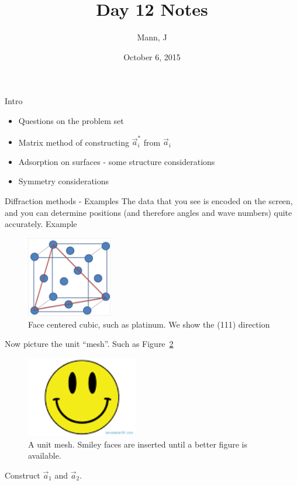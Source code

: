 \documentclass{article}
\author{Mann, J}
\title{Day 12 Notes}
\date{October 6, 2015}
\newcommand{\aone}[0]{\vec{a}_1}
\newcommand{\atwo}[0]{\vec{a}_2}
\begin{document}
\maketitle{}
\begin{section}{Intro}
	\begin{itemize}
		\item Questions on the problem set
		\item Matrix method of constructing $\vec{a}_i^\ast$ from $\vec{a}_i$
		\item Adsorption on surfaces - some structure considerations
		\item Symmetry considerations
	\end{itemize}
\end{section}
\begin{section}{Diffraction methods - Examples}
The data that you see is encoded on the screen, and you can determine positions (and therefore angles and wave numbers) quite accurately.
Example
\begin{figure}[h]
	\centering
	\includegraphics[height=100pt]{FCC111}
	\caption{Face centered cubic, such as platinum. We show the (111) direction}
	\label{fig:FCC}
\end{figure}

Now picture the unit ``mesh''. Such as Figure~\ref{fig:unitMesh}
\begin{figure}[h]
	\centering
	\includegraphics[height=100pt]{vacuumChamber}
	\caption{A unit mesh. Smiley faces are inserted until a better figure is available.} 
	\label{fig:unitMesh}
\end{figure}
Construct $\aone$ and $\atwo$.


\end{section}
\end{document}
